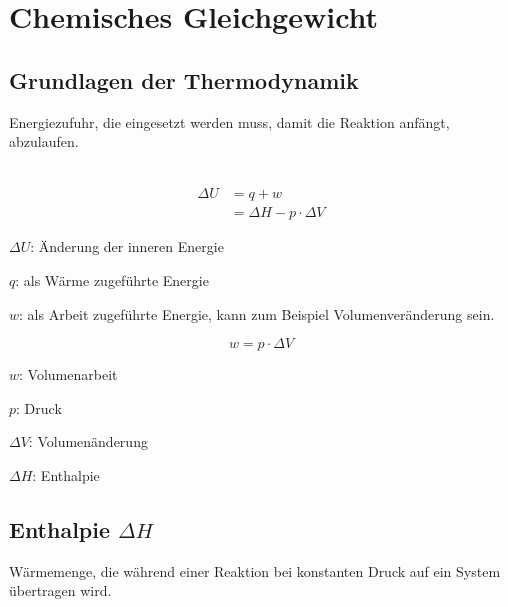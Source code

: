 \section{Chemisches Gleichgewicht}

\subsection{Grundlagen der Thermodynamik}

\begin{definition}[Aktivierungsenergie]
	Energiezufuhr, die eingesetzt werden muss, damit die Reaktion anfängt, abzulaufen.
\end{definition}

\begin{definition}
	\leavevmode \\
	{\large
		\begin{equation}
			\begin{split}
				\Delta U &= q+w \\
				&= \Delta H - p \cdot \Delta V
			\end{split}
		\end{equation}	
	}
	
	$\Delta U$: Änderung der inneren Energie
	
	$q$: als Wärme zugeführte Energie
	
	$w$: als Arbeit zugeführte Energie, kann zum Beispiel Volumenveränderung sein.

\end{definition}

\begin{definition}[Volumenarbeit]
	{\large
		\begin{equation}
			w = p \cdot \Delta V
		\end{equation}
	}
	
	$w$: Volumenarbeit
	
	$p$: Druck
	
	$\Delta V$: Volumenänderung
	
	$\Delta H$: Enthalpie
	
\end{definition}

\subsection{Enthalpie $\Delta H$}

Wärmemenge, die während einer Reaktion bei konstanten Druck auf ein System übertragen wird.
	
